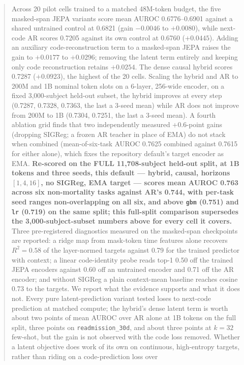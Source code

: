 \documentclass[11pt,a4paper]{article}
\newcommand{\code}[1]{\texttt{\small #1}}
\begin{document}
\begin{abstract}
Across 20 pilot cells trained to a matched 48M-token budget, the five
masked-span JEPA variants score mean AUROC 0.6776--0.6901 against a shared
untrained control at 0.6821 (gain $-0.0046$ to $+0.0080$), while next-code AR
scores 0.7205 against its own control at 0.6760 ($+0.0445$). Adding an
auxiliary code-reconstruction term to a masked-span JEPA raises the gain to
$+0.0177$ to $+0.0296$; removing the latent term entirely and keeping only
code reconstruction retains $+0.0254$. The dense causal hybrid scores 0.7287
($+0.0923$), the highest of the 20 cells. Scaling the hybrid and AR to 200M
and 1B nominal token slots on a 6-layer, 256-wide encoder, on a fixed
3{,}000-subject held-out subset, the hybrid improves at every step (0.7287,
0.7328, 0.7363, the last a 3-seed mean) while AR does not improve from 200M
to 1B (0.7304, 0.7251, the last a 3-seed mean). A fourth ablation grid finds
that two independently measured +0.6-point gains (dropping SIGReg; a frozen
AR teacher in place of EMA) do not stack when combined (mean-of-six-task
AUROC 0.7625 combined against 0.7615 for either alone), which fixes the
repository default's target encoder as EMA. \textbf{Re-scored on the FULL
11{,}708-subject held-out split, at 1B tokens and three seeds, this default
--- hybrid, causal, horizons $[1,4,16]$, no SIGReg, EMA target --- scores
mean AUROC 0.763 across six non-mortality tasks against AR's 0.744, with
per-task seed ranges non-overlapping on all six, and above \code{gbm} (0.751)
and \code{lr} (0.719) on the same split; this full-split comparison
supersedes the 3{,}000-subject-subset numbers above for every cell it
covers.} Three pre-registered diagnostics
measured on the
masked-span checkpoints are reported: a ridge map from mask-token time
features alone recovers $R^2 = 0.58$ of the layer-normed targets against 0.79
for the trained predictor with context; a linear code-identity probe reads
top-1 0.50 off the trained JEPA encoders against 0.60 off an untrained
encoder and 0.71 off the AR encoder; and without SIGReg a plain context-mean
baseline reaches cosine 0.73 to the targets. We report what the evidence
supports and what it does not. Every pure latent-prediction variant tested
loses to next-code prediction at matched compute; the hybrid's dense latent
term is worth about two points of mean AUROC over AR alone at 1B tokens on
the full split, three points on \code{readmission\_30d}, and about three
points at $k{=}32$ few-shot, but the gain is not observed with the code loss
removed. Whether a latent objective does work of its own on continuous,
high-entropy targets, rather than riding on a code-prediction loss over

\end{abstract}
\end{document}
